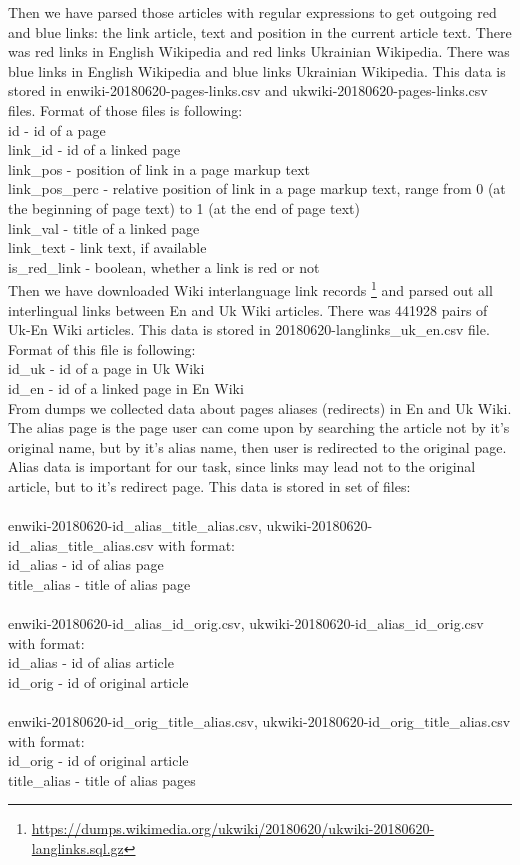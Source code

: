 \documentclass[11pt,a4paper]{article}
\begin{document}
Then we have parsed those articles with regular expressions to get outgoing red and blue links: the link article, text and position in the current article text. There was red links in English Wikipedia and red links Ukrainian Wikipedia. There was blue links in English Wikipedia and blue links Ukrainian Wikipedia. This data is stored in enwiki-20180620-pages-links.csv and ukwiki-20180620-pages-links.csv files. Format of those files is following:\\
id - id of a page\\
link\_id - id of a linked page\\
link\_pos - position of link in a page markup text\\  
link\_pos\_perc - relative position of link in a page markup text, range from 0 (at the beginning of page text) to 1 (at the end of page text)\\  
link\_val - title of a linked page\\  
link\_text - link text, if available\\  
is\_red\_link - boolean, whether a link is red or not\\  

Then we have downloaded Wiki interlanguage link records \footnote{\url{https://dumps.wikimedia.org/ukwiki/20180620/ukwiki-20180620-langlinks.sql.gz}} and parsed out all interlingual links between En and Uk Wiki articles. There was 441928 pairs of Uk-En Wiki articles. This data is stored in 20180620-langlinks\_uk\_en.csv file. Format of this file is following:\\
id\_uk - id of a page in Uk Wiki\\
id\_en - id of a linked page in En Wiki\\

From dumps we collected data about pages aliases (redirects) in En and Uk Wiki. The alias page is the page user can come upon by searching the article not by it's original name, but by it's alias name, then user is redirected to the original page. Alias data is important for our task, since links may lead not to the original article, but to it's redirect page. This data is stored in set of files:\\
\\
enwiki-20180620-id\_alias\_title\_alias.csv, ukwiki-20180620-id\_alias\_title\_alias.csv with format:\\
id\_alias - id of alias page\\
title\_alias - title of alias page\\
\\
enwiki-20180620-id\_alias\_id\_orig.csv, ukwiki-20180620-id\_alias\_id\_orig.csv with format:\\
id\_alias - id of alias article\\
id\_orig - id of original article\\
\\
enwiki-20180620-id\_orig\_title\_alias.csv, ukwiki-20180620-id\_orig\_title\_alias.csv with format:\\
id\_orig - id of original article\\
title\_alias - title of alias pages\\
\end{document}
